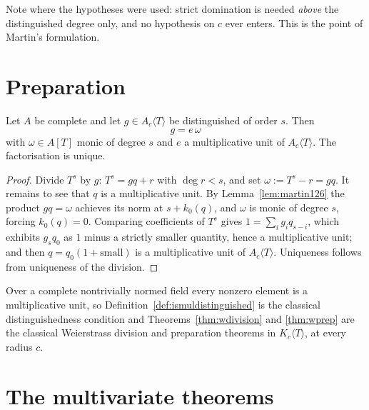 Note where the hypotheses were used: strict domination is needed \emph{above} the distinguished
degree only, and no hypothesis on $c$ ever enters.  This is the point of Martin's formulation.

\section{Preparation}

\begin{theorem}
  \label{thm:wprep}
  \leanok
  Let $A$ be complete and let $g \in A_c \langle T \rangle$ be distinguished of order $s$.  Then
  \[
    g = e \, \omega
  \]
  with $\omega \in A[T]$ monic of degree $s$ and $e$ a multiplicative unit of $A_c\langle T
  \rangle$.  The factorisation is unique.
\end{theorem}

\begin{proof}
  \leanok
  Divide $T^s$ by $g$: $T^s = g q + r$ with $\deg r < s$, and set $\omega := T^s - r = gq$.  It
  remains to see that $q$ is a multiplicative unit.  By Lemma~\ref{lem:martin126} the product
  $gq = \omega$ achieves its norm at $s + k_0(q)$, and $\omega$ is monic of degree $s$, forcing
  $k_0(q) = 0$.  Comparing coefficients of $T^s$ gives $1 = \sum_i g_i q_{s - i}$, which exhibits
  $g_s q_0$ as $1$ minus a strictly smaller quantity, hence a multiplicative unit; and then $q =
  q_0 (1 + \text{small})$ is a multiplicative unit of $A_c\langle T\rangle$.  Uniqueness follows
  from uniqueness of the division.
\end{proof}

\begin{corollary}
  \label{cor:wprep-field}
  \leanok
  Over a complete nontrivially normed field every nonzero element is a multiplicative unit, so
  Definition~\ref{def:ismuldistinguished} is the classical distinguishedness condition and
  Theorems~\ref{thm:wdivision} and \ref{thm:wprep} are the classical Weierstrass division and
  preparation theorems in $K_c\langle T \rangle$, at every radius $c$.
\end{corollary}

\section{The multivariate theorems}

